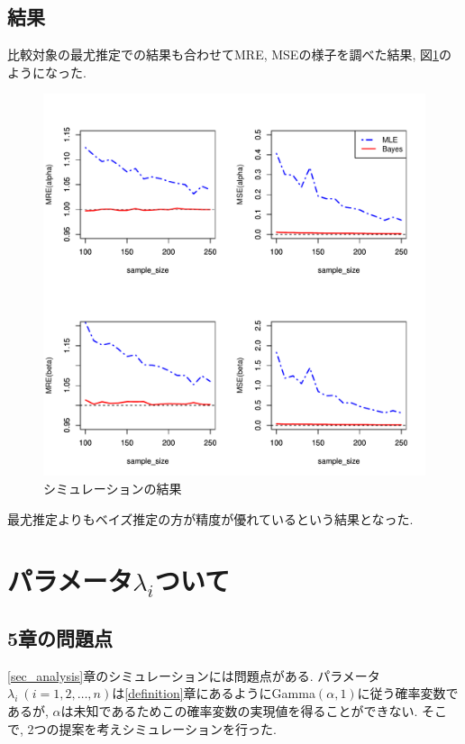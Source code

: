 \documentclass[titlepage,twoside]{jarticle}
\theoremstyle{definition}
\begin{document}
\subsection{結果}

比較対象の最尤推定での結果も合わせてMRE, MSEの様子を調べた結果, 図\ref{fig2}のようになった.
\begin{figure}[ht]
\begin{center}
\includegraphics[width=120mm]{result}
\caption{シミュレーションの結果}
\label{fig2}
\end{center}
\end{figure}
最尤推定よりもベイズ推定の方が精度が優れているという結果となった.

\section{パラメータ\texorpdfstring{$\lambda_i$}について}

\subsection{5章の問題点}

\ref{sec_analysis}章のシミュレーションには問題点がある.
パラメータ$\lambda_i~(i=1,2,\ldots,n)$は\ref{definition}章にあるようにGamma$(\alpha,1)$に従う確率変数であるが, $\alpha $は未知であるためこの確率変数の実現値を得ることができない. そこで, 2つの提案を考えシミュレーションを行った.
\end{document}
